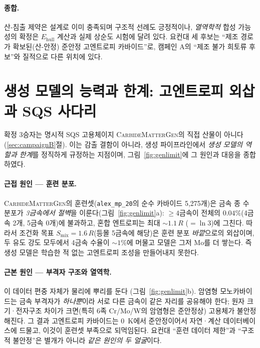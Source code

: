 \documentclass[11pt,a4paper]{report}
\begin{document}
\paragraph{종합.} 산-침출 제약은 설계로 이미 충족되며 구조적 선례도 긍정적이나, \emph{열역학적} 합성
가능성의 확정은 $E_{\mathrm{hull}}$ 계산과 실제 상순도 시험에 달려 있다. 요컨대 세 후보는 ``제조 경로가
확보된(산-안정) 준안정 고엔트로피 카바이드''로, 캠페인 A의 ``제조 불가 희토류 후보''와 질적으로 다른
위치에 있다.

\section{생성 모델의 능력과 한계: 고엔트로피 외삽과 SQS 사다리}
\label{sec:gen-limit}
확정 3승자는 명시적 SQS 고용체이지 \textsc{CarbideMatterGen}의 직접 산물이 아니다(\ref{sec:campaignB}절).
이는 감출 결함이 아니라, 생성 파이프라인에서 \emph{생성 모델의 역할과 한계}를 정직하게 규정하는 지점이며,
그림~\ref{fig:genlimit}에 그 원인과 대응을 종합하였다.

\paragraph{근접 원인 --- 훈련 분포.} \textsc{CarbideMatterGen}의 훈련셋(\texttt{alex\_mp\_20}의 순수
카바이드 5{,}275개)은 금속 종 수 분포가 \emph{3금속에서 절벽}을 이룬다(그림~\ref{fig:genlimit}a):
$\ge\!4$금속이 전체의 $0.04\%$(4금속 2개, 5금속 0개)에 불과하고, 혼합 엔트로피는 최대 $\sim\!1.1\,R$
($=\ln 3$)에 그친다. 따라서 조건화 목표 $S_{\mathrm{mix}}=1.6\,R$(등몰 5금속에 해당)은 훈련 분포
\emph{바깥}으로의 외삽이며, 두 유도 강도 모두에서 4금속 수율이 $\sim\!1\%$에 머물고 모델은 그저 Mo를
더 쌓는다. 즉 생성 모델은 학습한 적 없는 고엔트로피 조성을 만들어내지 못한다.

\paragraph{근본 원인 --- 부격자 구조와 열역학.} 이 데이터 편중 자체가 물리에 뿌리를 둔다
(그림~\ref{fig:genlimit}b). 암염형 모노카바이드는 금속 부격자가 \emph{하나뿐}이라 서로 다른 금속이
같은 자리를 공유해야 한다; 원자 크기·전자구조 차이가 크면(특히 6족 Cr/Mo/W의 암염형은 준안정상)
고용체가 불안정해진다. 그 결과 고엔트로피 카바이드는 0~K에서 준안정이어서 자연·계산 데이터베이스에
드물고, 이것이 훈련셋 부족으로 되먹임된다. 요컨대 ``훈련 데이터 제한''과 ``구조적 불안정''은 별개가
아니라 \emph{같은 원인의 두 얼굴}이다.
\end{document}
